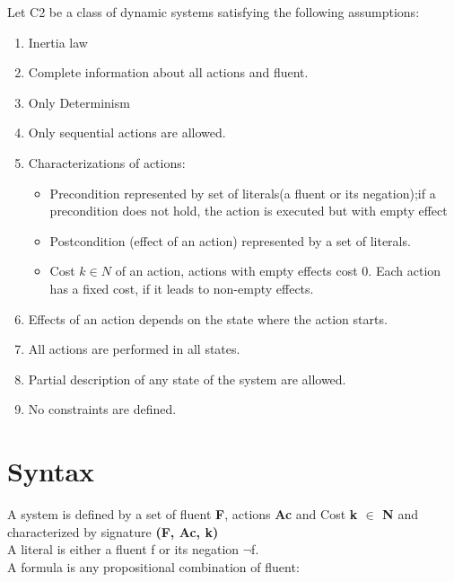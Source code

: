 \documentclass[11pt]{article}
\begin{document}
	Let C2 be a class of dynamic systems satisfying the following assumptions:
	\begin{enumerate}
		\item Inertia law
		\item Complete information about all actions and fluent. 
		\item Only Determinism
		\item Only sequential actions are allowed.
		\item Characterizations of actions:\begin{itemize}
			\item Precondition represented by set of literals(a fluent or its negation);if a precondition does not hold, the action is executed but with empty effect
			\item Postcondition (effect of an action) represented by a set of literals.
			\item Cost $k \in N $ of an action, actions with empty effects cost 0. Each action has a fixed cost, if it leads to non-empty effects. 
		\end{itemize}
		\item Effects of an action depends on the state where the action starts.
		\item All actions are performed in all states.
		\item Partial description of any state of the system are allowed.
		\item No constraints are defined.	 
	\end{enumerate}
	
	\section{Syntax}\label{sec:syntax}
	
	
	A system is defined by a set of fluent {\bfseries F}, actions {\bfseries Ac} and Cost {\bfseries k \(\in\) N} and characterized by signature {\bfseries(F, Ac, k)}\\
	A literal is either a fluent f or its negation $\neg$f.\\
	A formula is any propositional combination of fluent:
	
\end{document}
